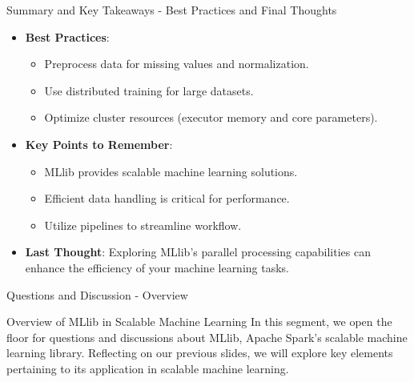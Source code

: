 \documentclass[aspectratio=169]{beamer}
\begin{document}
\begin{frame}[fragile]{Summary and Key Takeaways - Best Practices and Final Thoughts}
    \begin{itemize}
        \item \textbf{Best Practices}:
        \begin{itemize}
            \item Preprocess data for missing values and normalization.
            \item Use distributed training for large datasets.
            \item Optimize cluster resources (executor memory and core parameters).
        \end{itemize}
        \item \textbf{Key Points to Remember}:
        \begin{itemize}
            \item MLlib provides scalable machine learning solutions.
            \item Efficient data handling is critical for performance.
            \item Utilize pipelines to streamline workflow.
        \end{itemize}
        \item \textbf{Last Thought}:
        Exploring MLlib's parallel processing capabilities can enhance the efficiency of your machine learning tasks. 
    \end{itemize}
\end{frame}

\begin{frame}[fragile]{Questions and Discussion - Overview}
    \begin{block}{Overview of MLlib in Scalable Machine Learning}
        In this segment, we open the floor for questions and discussions about MLlib, Apache Spark's scalable machine learning library. Reflecting on our previous slides, we will explore key elements pertaining to its application in scalable machine learning.
    \end{block}
\end{frame}
\end{document}
